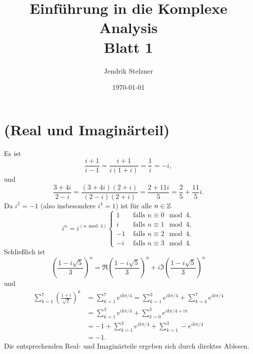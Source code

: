 \documentclass[a4paper,10pt]{article}
\title{\sc Einführung in die Komplexe Analysis \\ \Large Blatt 1}
\author{Jendrik Stelzner}
\date{\today}
\begin{document}
\maketitle





\section{(Real und Imaginärteil)}
Es ist
\[
 \frac{i+1}{i-1} = \frac{i+1}{i(1+i)} = \frac{1}{i} = -i,
\]
und
\[
 \frac{3+4i}{2-i} = \frac{(3+4i)(2+i)}{(2-i)(2+i)} = \frac{2+11i}{5} = \frac{2}{5} + \frac{11}{5}i.
\]
Da $i^2 = -1$ (also insbesondere $i^4 = 1$) ist für alle $n \in \mathbb{Z}$
\[
 i^n =
 i^{(n \bmod 4)}
 \begin{cases}
   1 & \text{ falls } n \equiv 0 \mod 4, \\
   i & \text{ falls } n \equiv 1 \mod 4, \\
  -1 & \text{ falls } n \equiv 2 \mod 4, \\
  -i & \text{ falls } n \equiv 3 \mod 4.
 \end{cases}
\]
Schließlich ist
\[
 \left(\frac{1-i\sqrt{5}}{3}\right)^n
 = \Re \left(\frac{1-i\sqrt{5}}{3}\right)^n + i \Im \left(\frac{1-i\sqrt{5}}{3}\right)^n
\]
und
\begin{align*}
 \sum_{k=1}^7 \left(\frac{1+i}{\sqrt{2}}\right)^k
 &= \sum_{k=1}^7 e^{ik\pi/4}
 = \sum_{k=1}^3 e^{ik\pi/4} + \sum_{k=4}^7 e^{ik\pi/4} \\
 &= \sum_{k=1}^3 e^{ik\pi/4} + \sum_{k=0}^3 e^{ik\pi/4+i\pi} \\
 &= -1 + \sum_{k=1}^3 e^{ik\pi/4} + \sum_{k=1}^3 -e^{ik\pi/4} \\
 &= -1.
\end{align*}
Die entsprechenden Real- und Imaginärteile ergeben sich durch direktes Ablesen.
\end{document}
